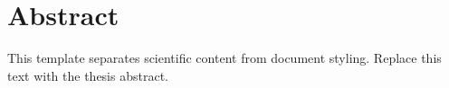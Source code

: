 \chapter*{Abstract}

This template separates scientific content from document styling. Replace this text with the thesis abstract.
